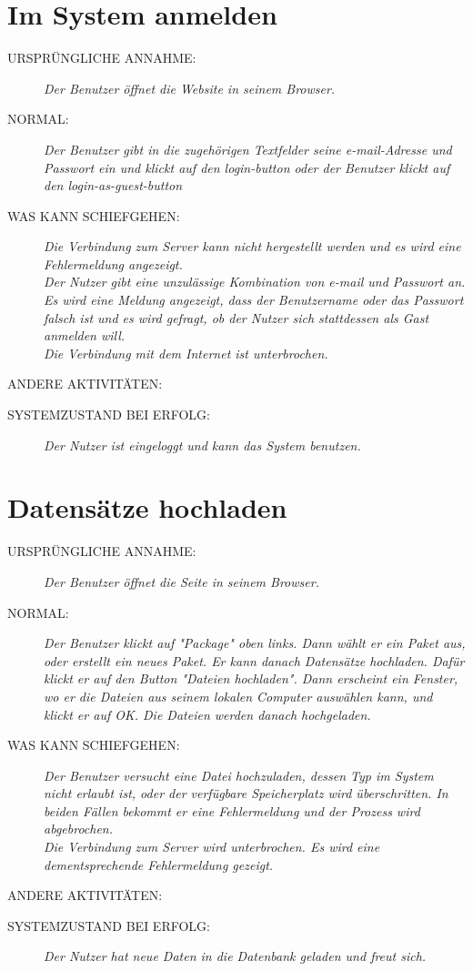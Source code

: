 

\section{Im System anmelden}
\begin{description}
  \item [URSPRÜNGLICHE ANNAHME:]
    \textit{Der Benutzer öffnet die Website in seinem Browser.}
  \item [NORMAL:]
    \textit{Der Benutzer gibt in die zugehörigen Textfelder seine e-mail-Adresse und Passwort ein und klickt auf den login-button oder der Benutzer klickt auf den login-as-guest-button}
  \item [WAS KANN SCHIEFGEHEN:]
    \textit{Die Verbindung zum Server kann nicht hergestellt werden und es wird eine Fehlermeldung angezeigt.\\ 
Der Nutzer gibt eine unzulässige Kombination von e-mail und Passwort an. Es wird eine Meldung angezeigt, dass der Benutzername oder das Passwort falsch ist und es wird gefragt, ob der Nutzer sich stattdessen als Gast anmelden will.\\
Die Verbindung mit dem Internet ist unterbrochen.
}
  \item [ANDERE AKTIVITÄTEN:]
    \textit{}
  \item [SYSTEMZUSTAND BEI ERFOLG:]
    \textit{Der Nutzer ist eingeloggt und kann das System benutzen.}
\end{description}


\section{Datensätze hochladen}
\begin{description}
  \item [URSPRÜNGLICHE ANNAHME:]
    \textit{Der Benutzer öffnet die Seite in seinem Browser.}
  \item [NORMAL:]
    \textit{Der Benutzer klickt auf "Package" oben links. Dann wählt er ein Paket aus, oder erstellt ein neues Paket. Er kann danach Datensätze hochladen. Dafür klickt er auf den Button "Dateien hochladen". Dann erscheint ein Fenster, wo er die Dateien aus seinem lokalen Computer auswählen kann, und klickt er auf OK. Die Dateien werden danach hochgeladen.}
  \item [WAS KANN SCHIEFGEHEN:]
    \textit{Der Benutzer versucht eine Datei hochzuladen, dessen Typ im System nicht erlaubt ist, oder der verfügbare Speicherplatz wird überschritten. In beiden Fällen bekommt er eine Fehlermeldung und der Prozess wird abgebrochen.\\
    Die Verbindung zum Server wird unterbrochen. Es wird eine dementsprechende Fehlermeldung gezeigt.
}
  \item [ANDERE AKTIVITÄTEN:]
    \textit{}
  \item [SYSTEMZUSTAND BEI ERFOLG:]
    \textit{Der Nutzer hat neue Daten in die Datenbank geladen und freut sich.}
\end{description}


